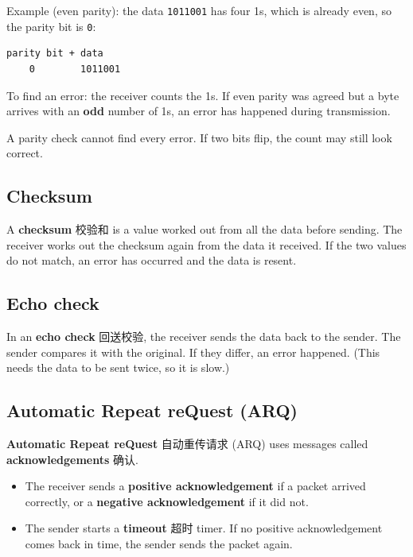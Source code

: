 \documentclass[11pt]{article}
\begin{document}
Example (even parity): the data \texttt{1011001} has four 1s, which is already even, so the parity bit is \texttt{0}:

\begin{Verbatim}
parity bit + data
    0        1011001
\end{Verbatim}

To find an error: the receiver counts the 1s. If even parity was agreed but a byte arrives with an \textbf{odd} number of 1s, an error has happened during transmission.

A parity check cannot find every error. If two bits flip, the count may still look correct.

\subsection*{Checksum}

A \textbf{checksum} 校验和 is a value worked out from all the data before sending. The receiver works out the checksum again from the data it received. If the two values do not match, an error has occurred and the data is resent.

\subsection*{Echo check}

In an \textbf{echo check} 回送校验, the receiver sends the data back to the sender. The sender compares it with the original. If they differ, an error happened. (This needs the data to be sent twice, so it is slow.)

\subsection*{Automatic Repeat reQuest (ARQ)}

\textbf{Automatic Repeat reQuest} 自动重传请求 (ARQ) uses messages called \textbf{acknowledgements} 确认.

\begin{itemize}
\item The receiver sends a \textbf{positive acknowledgement} if a packet arrived correctly, or a \textbf{negative acknowledgement} if it did not.

\item The sender starts a \textbf{timeout} 超时 timer. If no positive acknowledgement comes back in time, the sender sends the packet again.

\end{itemize}
\end{document}
